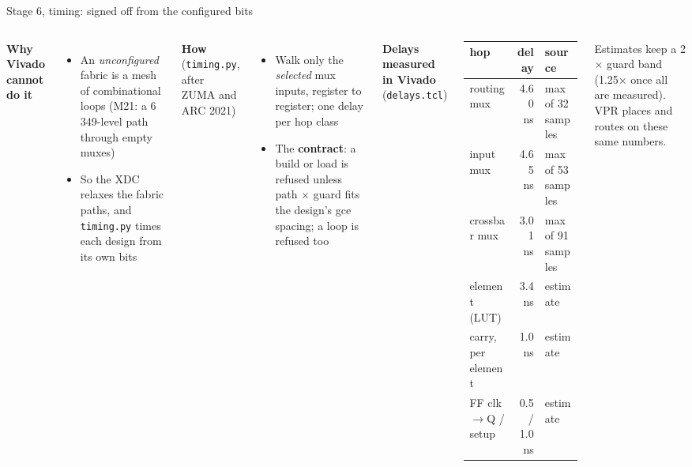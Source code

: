 \documentclass[aspectratio=169,11pt]{beamer}
\newcommand{\src}[1]{{\scriptsize\color{bobmute}#1}}
\begin{document}
\begin{frame}{Stage 6, timing: signed off from the configured bits}
  \begin{columns}[T]
    \footnotesize
    \textbf{Why Vivado cannot do it}
    \begin{itemize}
      \item An \emph{unconfigured} fabric is a mesh of combinational loops (M21: a 6\,349-level path through empty muxes)
      \item So the XDC relaxes the fabric paths, and \texttt{timing.py} times each design from its own bits
    \end{itemize}
    \textbf{How} (\texttt{timing.py}, after ZUMA and ARC 2021)
    \begin{itemize}
      \item Walk only the \emph{selected} mux inputs, register to register; one delay per hop class
      \item The \textbf{contract}: a build or load is refused unless path $\times$ guard fits the design's gce spacing; a loop is refused too
    \end{itemize}
    \footnotesize
    \textbf{Delays measured in Vivado} (\texttt{delays.tcl})
    \vspace{1mm}

    \centering
    \scriptsize
    \begin{tabular}{@{}lrl@{}}
      \toprule
      hop & delay & source \\
      \midrule
      routing mux & 4.60 ns & max of 32 samples \\
      input mux & 4.65 ns & max of 53 samples \\
      crossbar mux & 3.01 ns & max of 91 samples \\
      element (LUT) & 3.4 ns & estimate \\
      carry, per element & 1.0 ns & estimate \\
      FF clk$\rightarrow$Q / setup & 0.5 / 1.0 ns & estimate \\
      \bottomrule
    \end{tabular}

    \raggedright
    \src{Estimates keep a 2$\times$ guard band (1.25$\times$ once all are measured). VPR places and routes on these same numbers.}


\end{columns}
\end{frame}
\end{document}
